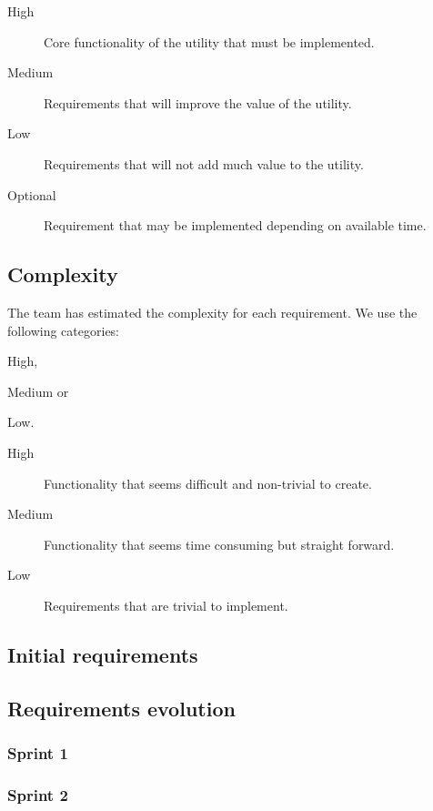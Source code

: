 \begin{description}
	\item[High] Core functionality of the \gls{utility} that must be implemented.
	\item[Medium] Requirements that will improve the value of the \gls{utility}.
	\item[Low] Requirements that will not add much value to the \gls{utility}.
	\item[Optional] Requirement that may be implemented depending on available time.
\end{description}

\subsection{Complexity}
\label{sec:req:compl}
The team has estimated the complexity for each requirement. We use the following categories:
\begin{inparaenum}
	\item High,
	\item Medium or
	\item Low.
\end{inparaenum}

\begin{description}
	\item[High] Functionality that seems difficult and non-trivial to create.
	\item[Medium] Functionality that seems time consuming but straight forward.
	\item[Low] Requirements that are trivial to implement.
\end{description}

\subsection{Initial requirements}

\subsection{Requirements evolution}

\subsubsection{Sprint 1}

\subsubsection{Sprint 2}

